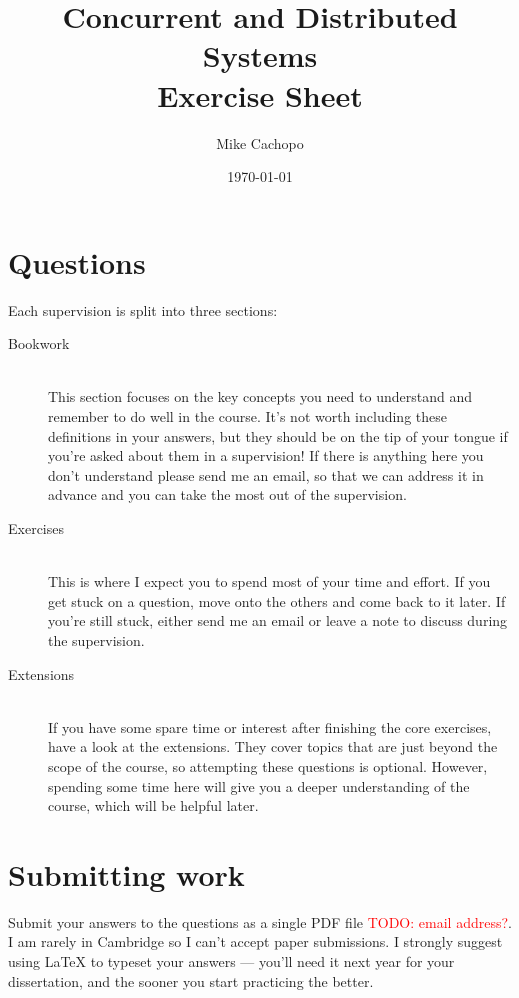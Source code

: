 \documentclass[12pt,a4paper,oneside,openright]{report}
\title{Concurrent and Distributed Systems\\ Exercise Sheet}
\date{\today}
\author{Mike Cachopo}
\newcommand{\todo}[1]{\textcolor{red}{TODO: #1}}
\begin{document}

\pagestyle{empty}

\maketitle

\newpage

\pagestyle{plain} 

\section*{Questions}

Each supervision is split into three sections:

\begin{description}
\item[Bookwork] \hfill\\
  This section focuses on the key concepts you need to understand and
  remember to do well in the course. It's not worth including these
  definitions in your answers, but they should be on the tip of your
  tongue if you're asked about them in a supervision! If there is
  anything here you don't understand please send me an email, so that
  we can address it in advance and you can take the most out of the
  supervision.
\item[Exercises] \hfill\\
  This is where I expect you to spend most of your time and effort. If
  you get stuck on a question, move onto the others and come back to
  it later. If you're still stuck, either send me an email or leave a
  note to discuss during the supervision.
\item[Extensions] \hfill\\
  If you have some spare time or interest after finishing the core
  exercises, have a look at the extensions. They cover topics that are
  just beyond the scope of the course, so attempting these questions
  is optional. However, spending some time here will give you a deeper
  understanding of the course, which will be helpful later.
\end{description}

\section*{Submitting work}

Submit your answers to the questions as a single PDF file \todo{email
  address?}. I am rarely in Cambridge so I can't accept paper
submissions. I strongly suggest using LaTeX to typeset your answers
--- you'll need it next year for your dissertation, and the sooner you
start practicing the better.
\end{document}
